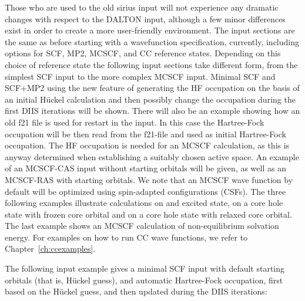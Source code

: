 Those who are used to the old {\sc sirius} input will not
experience any dramatic changes with respect to the DALTON input,
although a few minor differences exist in order to create a more
user-friendly environment. The input sections are the same as
before starting with a wavefunction specification, currently,
including options for SCF, MP2, MCSCF, and CC reference states.
Depending on this choice of reference state the following input
sections take different form, from the simplest SCF input to the
more complex MCSCF input. Minimal SCF and SCF+MP2
 using the new feature of generating the HF
occupation on the basis of an initial H\"{u}ckel
calculation and then possibly change the
occupation during the first DIIS iterations will be
shown. There will also be an example showing how an old f21 file
is used for restart in the input. 
In this case the Hartree-Fock occupation will be then read from
the f21-file and used as initial Hartree-Fock occupation. The HF occupation is
needed for an MCSCF calculation, as this is anyway
determined when establishing a suitably chosen active
space. An example of an
MCSCF-CAS input without starting
orbitals will be given, as well as an
MCSCF-RAS with starting orbitals. We note that an
MCSCF wave function by default will be optimized using
spin-adapted configurations (CSFs).
The three
following examples illustrate calculations on and excited
state, on a core hole state
with frozen core orbital and on a core hole
state with relaxed core orbital. The last
example shows an MCSCF calculation of non-equilibrium solvation
energy. For examples on how to run CC
wave functions, we refer to Chapter~\ref{ch:ccexamples}.

\bigskip

The following input example gives a minimal
SCF input with default
starting  orbitals (that is, H\"{u}ckel guess), and automatic Hartree-Fock
occupation, first based on the H\"{u}ckel guess, and
then updated during the DIIS iterations:

